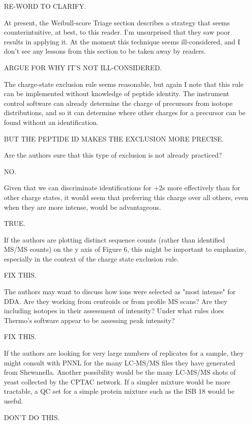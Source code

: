 RE-WORD TO CLARIFY.

At present, the Weibull-score Triage section describes a strategy that
seems counterintuitive, at best, to this reader.  I'm unsurprised that
they saw poor results in applying it.  At the moment this technique
seems ill-considered, and I don't see any lessons from this section to
be taken away by readers.

ARGUE FOR WHY IT'S NOT ILL-CONSIDERED.

The charge-state exclusion rule seems reasonable, but again I note
that this rule can be implemented without knowledge of peptide
identity.  The instrument control software can already determine the
charge of precursors from isotope distributions, and so it can
determine where other charges for a precursor can be found without an
identification.

BUT THE PEPTIDE ID MAKES THE EXCLUSION MORE PRECISE.

Are the authors sure that this type of exclusion is
not already practiced?

NO.

Given that we can discriminate identifications
for +2s more effectively than for other charge states, it would seem
that preferring this charge over all others, even when they are more
intense, would be advantageous.

TRUE.

If the authors are plotting distinct sequence counts (rather than
identified MS/MS counts) on the y axis of Figure 6, this might be
important to emphasize, especially in the context of the charge state
exclusion rule.

FIX THIS.

The authors may want to discuss how ions were selected as "most
intense" for DDA.  Are they working from centroids or from profile MS
scans?  Are they including isotopes in their assessment of intensity?
Under what rules does Thermo's software appear to be assessing peak
intensity?

FIX THIS.

If the authors are looking for very large numbers of replicates for a
sample, they might consult with PNNL for the many LC-MS/MS files they
have generated from Shewanella.  Another possibility would be the many
LC-MS/MS shots of yeast collected by the CPTAC network.  If a simpler
mixture would be more tractable, a QC set for a simple protein mixture
such as the ISB 18 would be useful.

DON'T DO THIS.


